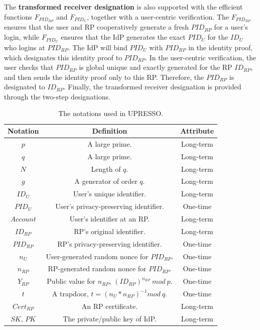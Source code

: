 The \textbf{transformed receiver designation} is also supported with the efficient functions $F_{PID_{RP}}$ and $F_{PID_U}$, together with  a user-centric verification.
The $F_{PID_{RP}}$ ensures that the user and RP cooperatively generate a fresh $PID_{RP}$  for a user's login,
 while $F_{PID_U}$ ensures that the IdP generates the exact $PID_U$ for the $ID_U$ who logins at $PID_{RP}$.
The IdP will bind $PID_{U}$ with $PID_{RP}$ in the identity proof, which designates this identity proof to $PID_{RP}$.
In the user-centric verification,  the user checks that $PID_{RP}$ is global unique and exactly generated for the RP $ID_{RP}$,
 and then sends the identity proof  only  to this RP. Therefore, the $PID_{RP}$ is designated to $ID_{RP}$.
Finally, the transformed receiver designation is provided through the two-step designations.


\begin{table}[tb]
    \caption{The notations used in UPRESSO.}
    \centering
    \begin{tabular}{|c|c|c|}
    \hline
    {Notation} & {Definition} & {Attribute} \\
    \hline
    {$p$} & {A large prime.} & {Long-term} \\
    \hline
    {$q$} & {A large prime.} & {Long-term} \\
    \hline
    {$N$} & {Length of $q$. } & {Long-term} \\
    \hline
    {$g$} & {A generator of order $q$. } & {Long-term} \\
    \hline
    {$ID_U$} & {User's unique identifier.} & {Long-term} \\
    \hline
    {$PID_U$} & {User's privacy-preserving identifier.} & {One-time}\\
    \hline
    {$Account$} & {User's identifier at an RP.} & {Long-term} \\
    \hline
    {$ID_{RP}$} & {RP's original identifier.} & {Long-term} \\
    \hline
    {$PID_{RP}$} & {RP's privacy-preserving identifier.} & {One-time} \\
    \hline
    {$n_U$} & {User-generated random nonce for $PID_{RP}$.} & {One-time} \\
    \hline
    {$n_{RP}$} & {RP-generated random nonce for $PID_{RP}$.} & {One-time} \\
    \hline
    {$Y_{RP}$} & {Public value for $n_{RP}$, $(ID_{RP})^{n_{RP}} \ mod\ p$.} & {One-time} \\
    \hline
    {$t$} & {A trapdoor, $t=(n_U*n_{RP})^{-1} mod \ q$.} & {One-time} \\
    \hline
    {$Cert_{RP}$} & {An RP certificate. } & {Long-term} \\
    \hline
    {$SK$, $PK$} & {The private/public key of IdP. } & {Long-term} \\
     \hline
    \end{tabular}
    \label{tbl:notations}
\end{table}


